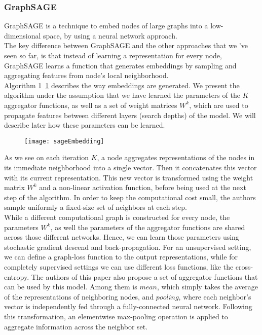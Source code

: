 \subsubsection*{GraphSAGE}
GraphSAGE \cite{inductive} is a technique to embed nodes of large graphs into a
low-dimensional space, by using a neural network approach.\\
The key difference between GraphSAGE and the other approaches that we 've seen
so far, is that instead of learning a representation for every node, GraphSAGE
learns a function that generates embeddings by sampling and aggregating features
from node's local neighborhood.\\
 Algorithm 1~\ref{algo} describes the way
embeddings are generated. We present the algorithm under the assumption that
we have learned the parameters of the $K$ aggregator functions, as well as a
set of weight matrices $W^k$, which are used to propagate features between
different layers (search depths) of the model. We will describe later how these
parameters can be learned.
\begin{figure}[h!tb]
\texttt{[image: sageEmbedding]}
\label{algo}
\end{figure}
As we see on each iteration $K$, a node aggregates representations of the nodes
in its immediate neighborhood into a single vector. Then it concatenates this
vector with its current representation. This new vector is transformed using the weight matrix
$W^k$ and a non-linear activation function, before being used at the next step
of the algorithm. In order to keep the computational cost small, the authors
sample uniformly a fixed-size set of neighbors at each step.\\
 While a different computational graph is
constructed for every node, the parameters $W^k$, as well the parameters of the
aggregator functions are shared across those different networks. Hence, we can
learn those parameters using stochastic gradient descend and back-propagation.
For an unsupervised setting, we can define a graph-loss function to the output
representations, while for completely supervised settings we can use different
loss functions, like the cross-entropy.
 The authors of this paper also propose a set of
aggregator functions that can be used by this model. Among them is $mean$, which
simply takes the average of the representations of neighboring nodes, and
$pooling$, where each neighbor's vector is independently fed through a
fully-connected neural network. Following this transformation, an elementwise
max-pooling operation is applied to aggregate information across the neighbor
set.

